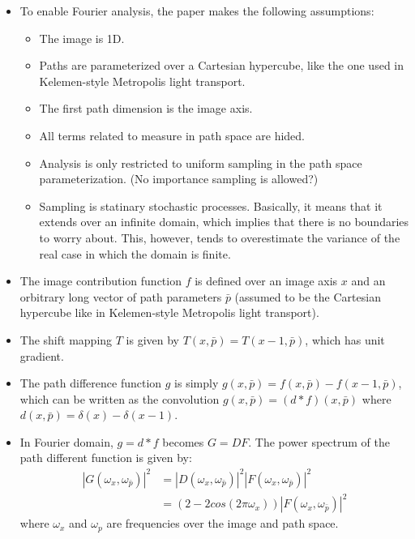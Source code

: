 \documentclass[10pt]{article}
\begin{document}
  \begin{itemize}
  	\item To enable Fourier analysis, the paper makes the following assumptions:
  	\begin{itemize}
  		\item The image is 1D.
  		\item Paths are parameterized over a Cartesian hypercube, like the one used in Kelemen-style Metropolis light transport.
  		\item The first path dimension is the image axis.
  		\item All terms related to measure in path space are hided.
  		\item Analysis is only restricted to uniform sampling in the path space parameterization.  (No importance sampling is allowed?)
  		\item Sampling is statinary stochastic processes.  Basically, it means that it extends over an infinite domain, which implies that there is no boundaries to worry about.  This, however, tends to overestimate the variance of the real case in which the domain is finite.  	
  	\end{itemize}

  	\item The image contribution function $f$ is defined over an image axis $x$ and an orbitrary long vector of path parameters $\bar p$ (assumed to be the Cartesian hypercube like in Kelemen-style Metropolis light transport).

  	\item The shift mapping $T$ is given by $T(x, \bar p) = T(x-1, \bar p)$, which has unit gradient.

  	\item The path difference function $g$ is simply $g(x, \bar p) = f(x, \bar p) - f(x-1, \bar p)$, which can be written as the convolution $g(x, \bar p) = (d * f)(x, \bar p)$ where $d(x, \bar p) = \delta(x) - \delta(x-1).$ 

  	\item In Fourier domain, $g = d * f$ becomes $G = DF$.  The power spectrum of the path different function is given by:
  	\begin{align*}
  		|G(\omega_x, \omega_{\bar p})|^2 
  		&= |D(\omega_x, \omega_{\bar p})|^2 |F(\omega_x, \omega_{\bar p})|^2 \\
  		&= (2 - 2 cos(2\pi \omega_x)) |F(\omega_x, \omega_{\bar p})|^2 
  	\end{align*}
  	where $\omega_x$ and $\omega_p$ are frequencies over the image and path space.


\end{itemize}
\end{document}
